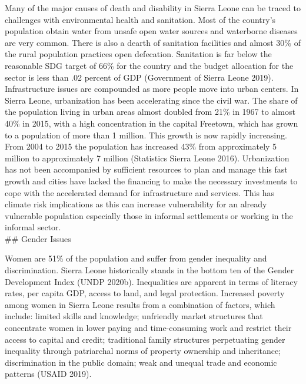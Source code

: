 \documentclass[
]{book}
\begin{document}
Many of the major causes of death and disability in Sierra Leone can be traced to challenges with environmental health and sanitation. Most of the country's population obtain water from unsafe open water sources and waterborne diseases are very common. There is also a dearth of sanitation facilities and almost 30\% of the rural population practices open defecation. Sanitation is far below the reasonable SDG target of 66\% for the country and the budget allocation for the sector is less than .02 percent of GDP (Government of Sierra Leone 2019).\\
Infrastructure issues are compounded as more people move into urban centers. In Sierra Leone, urbanization has been accelerating since the civil war. The share of the population living in urban areas almost doubled from 21\% in 1967 to almost 40\% in 2015, with a high concentration in the capital Freetown, which has grown to a population of more than 1 million. This growth is now rapidly increasing. From 2004 to 2015 the population has increased 43\% from approximately 5 million to approximately 7 million (Statistics Sierra Leone 2016). Urbanization has not been accompanied by sufficient resources to plan and manage this fast growth and cities have lacked the financing to make the necessary investments to cope with the accelerated demand for infrastructure and services. This has climate risk implications as this can increase vulnerability for an already vulnerable population especially those in informal settlements or working in the informal sector.\\
\#\# Gender Issues

Women are 51\% of the population and suffer from gender inequality and discrimination. Sierra Leone historically stands in the bottom ten of the Gender Development Index (UNDP 2020b). Inequalities are apparent in terms of literacy rates, per capita GDP, access to land, and legal protection. Increased poverty among women in Sierra Leone results from a combination of factors, which include: limited skills and knowledge; unfriendly market structures that concentrate women in lower paying and time-consuming work and restrict their access to capital and credit; traditional family structures perpetuating gender inequality through patriarchal norms of property ownership and inheritance; discrimination in the public domain; weak and unequal trade and economic patterns (USAID 2019).
\end{document}
